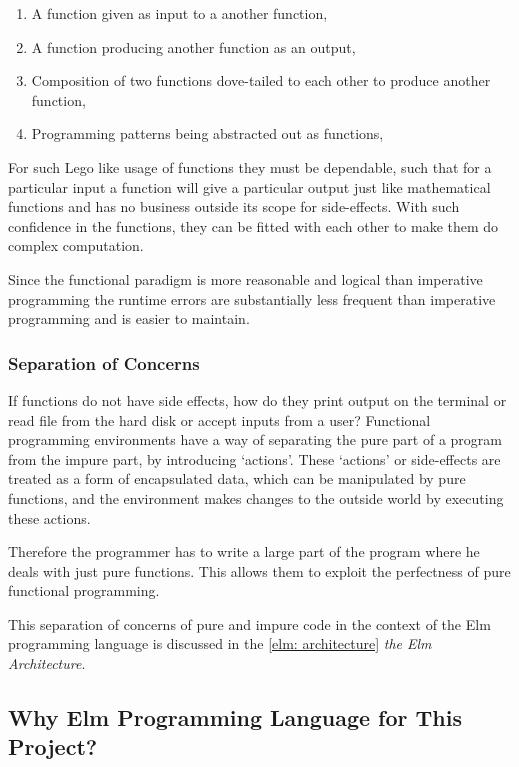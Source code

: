 \begin{enumerate}
\item A function given as input to a another function,
\item A function producing another function as an output,
\item Composition of two functions dove-tailed to each other to produce another function,
\item Programming patterns being abstracted out as functions,
\end{enumerate}

For such Lego like usage of functions they must be dependable, such that for a
particular input a function will give a particular output just like
mathematical functions and has no business outside its scope for side-effects.
With such confidence in the functions, they can be fitted with each other to
make them do complex computation. \cite{Hughes89}

Since the functional paradigm is more reasonable and logical than imperative
programming the runtime errors are substantially less frequent than imperative
programming and is easier to maintain.


\subsubsection{Separation of Concerns}
If functions do not have side effects, how do they print
output on the terminal or read file from the hard disk or accept inputs from a
user? Functional programming environments have a way of separating the pure
part of a program from the impure part, by introducing `actions'. These
`actions' or side-effects are treated as a form of encapsulated data, which
can be manipulated by pure functions, and the environment makes changes to the
outside world by executing these actions.

Therefore the programmer has to write a large part of the program where he
deals with just pure functions. This allows them to exploit the perfectness of
pure functional programming.

This separation of concerns of pure and impure code in the context of the Elm
programming language is discussed in the \autoref{elm: architecture}
\emph{the Elm Architecture}.

\subsection{Why Elm Programming Language for This Project?}

